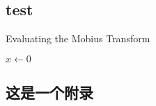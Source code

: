 \documentclass{xduugthesis}
\begin{document}
\section{test}
\begin{algorithm}
    \caption{Evaluating the Mobius Transform}
    \begin{algorithmic}
        \STATE $x\gets0$
        \ELSE
        \ENDIF
    \end{algorithmic}
\end{algorithm}

\backmatter
\begin{appendixes}
    \chapter{这是一个附录}
\end{appendixes}
\end{document}
